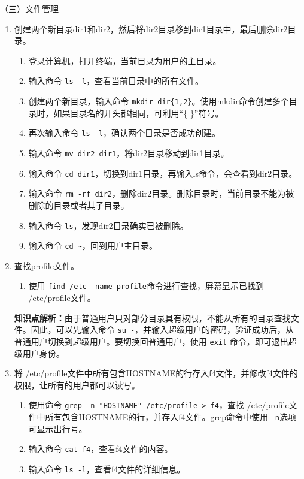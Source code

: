 \vspace{0.1in}
（三）文件管理
\begin{enumerate}
  \item 创建两个新目录dir1和dir2，然后将dir2目录移到dir1目录中，最后删除dir2目录。
    \begin{enumerate}
      \item 登录计算机，打开终端，当前目录为用户的主目录。
      \item 输入命令 \verb|ls -l|，查看当前目录中的所有文件。
      \item 创建两个新目录，输入命令 \verb|mkdir dir{1,2}|。使用mkdir命令创建多个目录时，如果目录名的开头都相同，可利用“\{ \}”符号。
      \item 再次输入命令 \verb|ls -l|，确认两个目录是否成功创建。
      \item 输入命令 \verb|mv dir2 dir1|，将dir2目录移动到dir1目录。
      \item 输入命令 \verb|cd dir1|，切换到dir1目录，再输入ls命令，会查看到dir2目录。
      \item 输入命令 \verb|rm -rf dir2|，删除dir2目录。删除目录时，当前目录不能为被删除的目录或者其子目录。
      \item 输入命令 \verb|ls|，发现dir2目录确实已被删除。
      \item 输入命令 \verb|cd ~|，回到用户主目录。
    \end{enumerate}
  \item 查找profile文件。
    \begin{enumerate}
      \item 使用 \verb|find /etc -name profile|命令进行查找，屏幕显示已找到 /etc/profile文件。
    \end{enumerate}
    \textbf{知识点解析：}由于普通用户只对部分目录具有权限，不能从所有的目录查找文件。因此，可以先输入命令 \verb|su -|，并输入超级用户的密码，验证成功后，从普通用户切换到超级用户。要切换回普通用户，使用 \verb|exit| 命令，即可退出超级用户身份。
  \item 将 /etc/profile文件中所有包含HOSTNAME的行存入f4文件，并修改f4文件的权限，让所有的用户都可以读写。
    \begin{enumerate}
      \item 使用命令 \verb|grep -n "HOSTNAME" /etc/profile > f4|，查找 /etc/profile文件中所有包含HOSTNAME的行，并存入f4文件。grep命令中使用 \verb|-n|选项可显示出行号。
      \item 输入命令 \verb|cat f4|，查看f4文件的内容。
      \item 输入命令 \verb|ls -l|，查看f4文件的详细信息。

\end{enumerate}
\end{enumerate}
